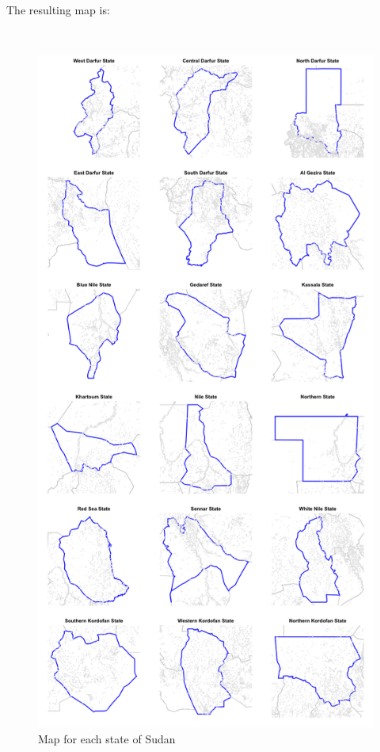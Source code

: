 \documentclass[12pt,a4paper,a4paper]{book}
\theoremstyle{definition}
\theoremstyle{definition}
\theoremstyle{definition}
\theoremstyle{remark}
\begin{document}
\newpage

The resulting map is:

~

\begin{figure}[H]

{\centering \includegraphics{figures/map15-1} 

}

\caption{Map for each state of Sudan}\label{fig:map15}
\end{figure}


\end{document}
